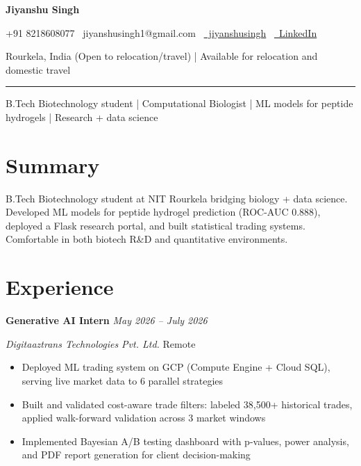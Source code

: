 \documentclass[11pt,a4paper]{article}
\begin{document}
\begin{center}
    {\LARGE \bfseries Jiyanshu Singh}
    
    \vspace{4pt}
    {\small +91 8218608077 \textbullet\ jiyanshusingh1@gmail.com \textbullet\ \href{https://github.com/jiyanshusingh}{\faGithub\ jiyanshusingh} \textbullet\ \href{https://linkedin.com/in/jiyanshusingh}{\faLinkedin\ LinkedIn}}
    
    \vspace{2pt}
    {\footnotesize Rourkela, India (Open to relocation/travel) | Available for relocation and domestic travel}
    
    \rule{\textwidth}{0.4pt}
\end{center}

\begin{center}
    {\large \color{midblue} B.Tech Biotechnology student | Computational Biologist | ML models for peptide hydrogels | Research + data science}
\end{center}

\vspace{6pt}
\section*{Summary}
B.Tech Biotechnology student at NIT Rourkela bridging biology + data science. Developed ML models for peptide hydrogel prediction (ROC-AUC 0.888), deployed a Flask research portal, and built statistical trading systems. Comfortable in both biotech R\&D and quantitative environments.

\section*{Experience}
\noindent\textbf{Generative AI Intern} \hfill \textit{May 2026 – July 2026}

\noindent\textit{Digitaaztrans Technologies Pvt. Ltd.} \hfill Remote
\begin{itemize}
    \item Deployed ML trading system on GCP (Compute Engine + Cloud SQL), serving live market data to 6 parallel strategies
    \item Built and validated cost-aware trade filters: labeled 38,500+ historical trades, applied walk-forward validation across 3 market windows
    \item Implemented Bayesian A/B testing dashboard with p-values, power analysis, and PDF report generation for client decision-making
\end{itemize}
\end{document}
